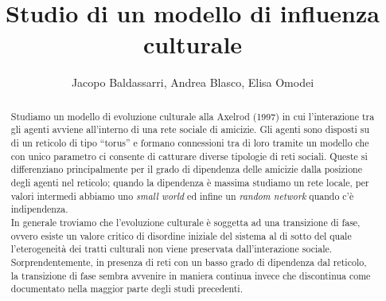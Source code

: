 \documentclass[a4paper,12pt]{article}
\title{\textbf{Studio di un modello di influenza culturale}}
\author{Jacopo Baldassarri, Andrea Blasco, Elisa Omodei}
\begin{document}
\maketitle

\begin{abstract}
Studiamo un modello di evoluzione culturale alla Axelrod (1997) in cui l'interazione tra gli agenti avviene all'interno di una rete sociale di amicizie. Gli agenti sono disposti su di un reticolo di tipo ``torus'' e formano  connessioni tra di loro tramite un modello che con unico parametro ci consente di catturare diverse tipologie di reti sociali. Queste si differenziano principalmente per il grado di dipendenza delle amicizie dalla posizione degli agenti nel reticolo; quando la dipendenza \`{e} massima studiamo un rete locale, per valori intermedi abbiamo uno \textit{small world} ed infine un \textit{random network} quando c'\`e indipendenza.    \\   
In generale troviamo che l'evoluzione culturale \`{e} soggetta ad una transizione di fase, ovvero esiste un valore critico di disordine iniziale del sistema al di sotto del quale l'eterogeneit\`{a} dei tratti culturali non viene preservata dall'interazione sociale.\\
Sorprendentemente, in presenza di reti con un basso grado di dipendenza dal reticolo, la transizione di fase sembra avvenire in maniera continua invece che discontinua come documentato nella maggior parte degli studi precedenti. 
\end{abstract}

\clearpage
\end{document}
